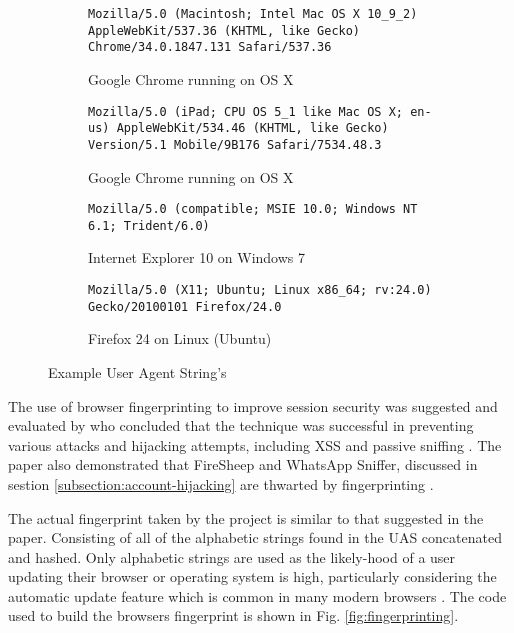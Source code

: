 \begin{figure}
\centering
\begin{subfigure}[a]{\textwidth}
\centering
\texttt{Mozilla/5.0 (Macintosh; Intel Mac OS X 10\_9\_2) AppleWebKit/537.36 (KHTML, like Gecko) Chrome/34.0.1847.131 Safari/537.36}
\caption{Google Chrome running on OS X}
\label{fig:uasforchrome}
\end{subfigure}

\begin{subfigure}[b]{\textwidth}
\centering
\texttt{Mozilla/5.0 (iPad; CPU OS 5\_1 like Mac OS X; en-us) AppleWebKit/534.46 (KHTML, like Gecko) Version/5.1 Mobile/9B176 Safari/7534.48.3}
\caption{ Google Chrome running on OS X}
\end{subfigure}

\begin{subfigure}[c]{\textwidth}
\centering
\texttt{Mozilla/5.0 (compatible; MSIE 10.0; Windows NT 6.1; Trident/6.0)}
\caption{Internet Explorer 10 on Windows 7}
\end{subfigure}

\begin{subfigure}[d]{\textwidth}
\centering
\texttt{Mozilla/5.0 (X11; Ubuntu; Linux x86\_64; rv:24.0) Gecko/20100101 Firefox/24.0}
\caption{Firefox 24 on Linux (Ubuntu)}
\end{subfigure}

\caption{Example User Agent String's}
\label{fig:useragentstring}
\end{figure}

The use of browser fingerprinting to improve session security was suggested and evaluated by  who concluded that the technique was successful in preventing various attacks and hijacking attempts, including XSS and passive sniffing . The paper also demonstrated that FireSheep and WhatsApp Sniffer, discussed in sestion \ref{subsection:account-hijacking} are thwarted by fingerprinting \parencite{unger2013fingerprinting}.

The actual fingerprint taken by the project is similar to that suggested in the paper. Consisting of all of the alphabetic strings found in the UAS concatenated and hashed. Only alphabetic strings are used as the likely-hood of a user updating their browser or operating system is high, particularly considering the automatic update feature which is common in many modern browsers \parencite{google2014autoupdate, firefox2014autoupdate}. The code used to build the browsers fingerprint is shown in Fig. \ref{fig:fingerprinting}.

